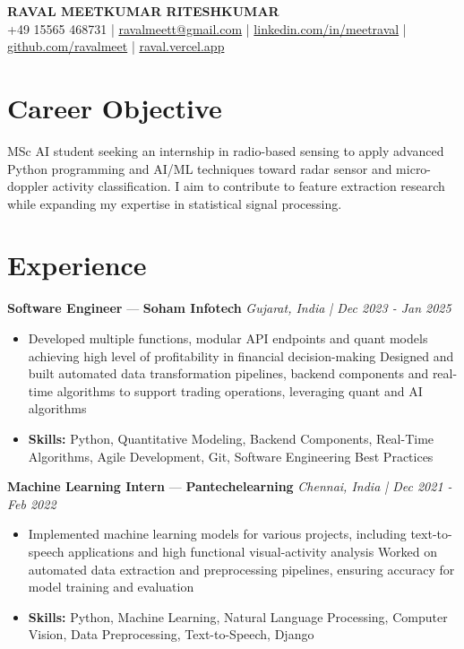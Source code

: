 \documentclass[a4paper,10pt]{article}
\begin{document}
\begin{center}
  {\Large\bfseries RAVAL MEETKUMAR RITESHKUMAR}\\[2pt]
  {\small +49 15565 468731 \;|\; \href{mailto:ravalmeett@gmail.com}{ravalmeett@gmail.com} \;|\; \href{https://www.linkedin.com/in/meetraval/}{linkedin.com/in/meetraval} \;|\; \href{https://github.com/ravalmeet}{github.com/ravalmeet} \;|\; \href{https://raval.vercel.app/}{raval.vercel.app}}
\end{center}
\vspace{-3pt}

\section*{Career Objective}
MSc AI student seeking an internship in radio-based sensing to apply advanced Python programming and AI/ML techniques toward radar sensor and micro-doppler activity classification. I aim to contribute to feature extraction research while expanding my expertise in statistical signal processing.\par

\section*{Experience}
\textbf{Software Engineer} — \textbf{Soham Infotech} \hfill \textit{Gujarat, India \;|\; Dec 2023 - Jan 2025}\par
\vspace{1pt}
\begin{itemize}
  \item Developed multiple functions, modular API endpoints and quant models achieving high level of profitability in financial decision-making Designed and built automated data transformation pipelines, backend components and real-time algorithms to support trading operations, leveraging quant and AI algorithms
  \item \textbf{Skills:} Python, Quantitative Modeling, Backend Components, Real-Time Algorithms, Agile Development, Git, Software Engineering Best Practices
\end{itemize}
\vspace{3pt}
\textbf{Machine Learning Intern} — \textbf{Pantechelearning} \hfill \textit{Chennai, India \;|\; Dec 2021 - Feb 2022}\par
\vspace{1pt}
\begin{itemize}
  \item Implemented machine learning models for various projects, including text-to-speech applications and high functional visual-activity analysis Worked on automated data extraction and preprocessing pipelines, ensuring accuracy for model training and evaluation
  \item \textbf{Skills:} Python, Machine Learning, Natural Language Processing, Computer Vision, Data Preprocessing, Text-to-Speech, Django
\end{itemize}
\end{document}
